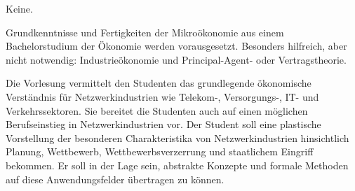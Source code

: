 \begin{course}

\setdoclanguagegerman
{}



\coursehead


\label{cour_4959.dp_997}


\begin{styleenv}
\begin{assessment}

\end{assessment}

\begin{conditions}Keine.\end{conditions}

\begin{recommendations}Grundkenntnisse und Fertigkeiten der Mikroökonomie aus einem Bachelorstudium der Ökonomie werden vorausgesetzt. Besonders hilfreich, aber nicht notwendig: Industrieökonomie und Principal-Agent- oder Vertragstheorie.

\end{recommendations}
\end{styleenv}

\begin{learningoutcomes}
Die Vorlesung vermittelt den Studenten das grundlegende ökonomische Verständnis für Netzwerkindustrien wie Telekom-, Versorgungs-, IT- und Verkehrssektoren. Sie bereitet die Studenten auch auf einen möglichen Berufseinstieg in Netzwerkindustrien vor. Der Student soll eine plastische Vorstellung der besonderen Charakteristika von Netzwerkindustrien hinsichtlich Planung, Wettbewerb, Wettbewerbsverzerrung und staatlichem Eingriff bekommen. Er soll in der Lage sein, abstrakte Konzepte und formale Methoden auf diese Anwendungsfelder übertragen zu können.


\end{learningoutcomes}


\end{course}

